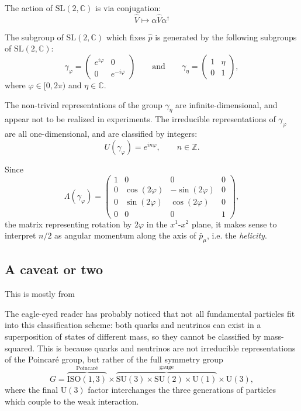 \documentclass[a4paper,10pt]{scrreprt}
\newcommand{\C}{\mathbb{C}}
\newcommand{\Z}{\mathbb{Z}}
\newcommand{\SL}{\mathrm{SL}}
\theoremstyle{definition}
\theoremstyle{plain}
\theoremstyle{remark}
\begin{document}
The action of $\SL(2, \C)$ is via conjugation:
\begin{equation*}
  \hat{V} \mapsto \alpha \hat{V} \alpha^{\dagger}
\end{equation*}

The subgroup of $\SL(2, \C)$ which fixes $\hat{p}$ is generated by the following subgroups of $\SL(2, \C)$:
\begin{equation*}
  \gamma_{\varphi} = 
  \begin{pmatrix}
    e^{i \varphi} & 0 \\
    0 & e^{-i \varphi}
  \end{pmatrix}
  \qquad\text{and}\qquad \gamma_{\eta} = 
  \begin{pmatrix}
    1 & \eta \\
    0 & 1
  \end{pmatrix},
\end{equation*}
where $\varphi \in [0, 2\pi)$ and $\eta \in \C$.

The non-trivial representations of the group $\gamma_{\eta}$ are infinite-dimensional, and appear not to be realized in experiments. The irreducible representations of $\gamma_{\varphi}$ are all one-dimensional, and are classified by integers:
\begin{equation*}
  U(\gamma_{\varphi}) = e^{i n \varphi},\qquad n \in \Z.
\end{equation*}

Since
\begin{equation*}
  \Lambda(\gamma_{\varphi}) = 
  \begin{pmatrix}
    1 & 0 & 0 & 0 \\
    0 & \cos(2\varphi) & -\sin(2\varphi) & 0 \\
    0 & \sin(2\varphi) & \cos(2\varphi) & 0 \\
    0 & 0 & 0 & 1
  \end{pmatrix},
\end{equation*}
the matrix representing rotation by $2\varphi$ in the $x^{1}$-$x^{2}$ plane, it makes sense to interpret $n/2$ as angular momentum along the axis of $\bar{p}_{\mu}$, i.e. the \emph{helicity}.


\subsection{A caveat or two}
This is mostly from \cite{neumaier}

The eagle-eyed reader has probably noticed that not all fundamental particles fit into this classification scheme: both quarks and neutrinos can exist in a superposition of states of different mass, so they cannot be classified by mass-squared. This is because quarks and neutrinos are not irreducible representations of the Poincar\'{e} group, but rather of the full symmetry group
\begin{equation*}
  G = \overbrace{\mathrm{ISO}(1, 3)}^{\text{Poincar\'{e}}} \times \overbrace{\mathrm{SU}(3) \times \mathrm{SU}(2) \times \mathrm{U}(1)}^{\text{gauge}} \times \mathrm{U}(3),
\end{equation*}
where the final $\mathrm{U}(3)$ factor interchanges the three generations of particles which couple to the weak interaction.
\end{document}
